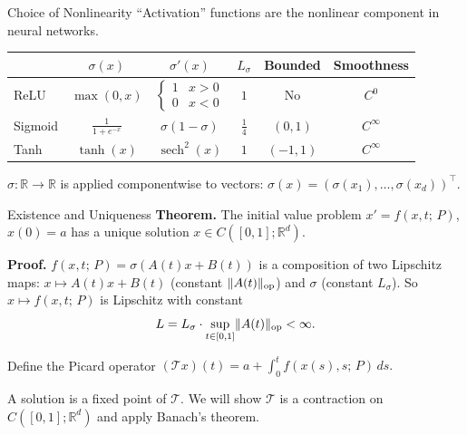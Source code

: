 \documentclass[aspectratio=169]{beamer}
\newcommand{\R}{\mathbb{R}}
\newcommand{\op}{\mathrm{op}}
\DeclareMathOperator{\sech}{sech}
\DeclarePairedDelimiter{\norm}{\lVert}{\rVert}
\begin{document}
\begin{frame}{Choice of Nonlinearity}
``Activation'' functions are the nonlinear component in neural networks.
\begin{center}
\begin{tabular}{lccccc}
\toprule
& $\sigma(x)$ & $\sigma'(x)$ & $L_\sigma$ & Bounded & Smoothness \\
\midrule
ReLU & $\max(0,x)$ & $\begin{cases} 1 & x>0 \\ 0 & x<0 \end{cases}$ & $1$ & No & $C^0$ \\[6pt]
Sigmoid & $\frac{1}{1+e^{-x}}$ & $\sigma(1-\sigma)$ & $\frac{1}{4}$ & $(0,1)$ & $C^\infty$ \\[6pt]
Tanh & $\tanh(x)$ & $\sech^2(x)$ & $1$ & $(-1,1)$ & $C^\infty$ \\
\bottomrule
\end{tabular}
\end{center}

\bigskip
$\sigma: \R \to \R$ is applied componentwise to vectors: $\sigma(x) = (\sigma(x_1), \ldots, \sigma(x_d))^\top$.
\end{frame}

\begin{frame}{Existence and Uniqueness}
\textbf{Theorem.} The initial value problem $x' = f(x, t;\,P)$, $x(0) = a$ has a unique solution $x \in C([0,1]; \R^d)$.

\bigskip
\textbf{Proof.} $f(x, t;\,P) = \sigma(A(t)x + B(t))$ is a composition of two Lipschitz maps: $x \mapsto A(t)x + B(t)$ (constant $\norm{A(t)}_\op$) and $\sigma$ (constant $L_\sigma$). So $x \mapsto f(x, t;\,P)$ is Lipschitz with constant
\[
L = L_\sigma \cdot \sup_{t \in [0,1]} \norm{A(t)}_\op < \infty.
\]

Define the Picard operator $(\mathcal{T}x)(t) = a + \int_0^t f(x(s), s;\,P)\,ds.$

\bigskip
A solution is a fixed point of $\mathcal{T}$. We will show $\mathcal{T}$ is a contraction on $C([0,1]; \R^d)$ and apply Banach's theorem.
\end{frame}
\end{document}
